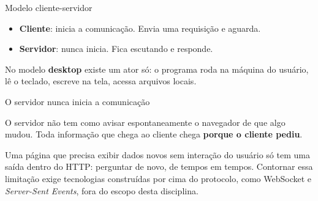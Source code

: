 \documentclass{beamer}
\begin{document}
\begin{frame}{Modelo cliente-servidor}
  \begin{center}
  \end{center}

  \begin{itemize}
    \item \textbf{Cliente}: inicia a comunicação. Envia uma requisição e aguarda.
    \item \textbf{Servidor}: nunca inicia. Fica escutando e responde.
  \end{itemize}

  \vspace{0.2cm}
  \footnotesize No modelo \textbf{desktop} existe um ator só: o programa roda na
  máquina do usuário, lê o teclado, escreve na tela, acessa arquivos locais.
\end{frame}

\begin{frame}{O servidor nunca inicia a comunicação}
  \begin{block}{}
    O servidor não tem como avisar espontaneamente o navegador de que algo
    mudou. Toda informação que chega ao cliente chega \textbf{porque o cliente
    pediu}.
  \end{block}

  \vspace{0.5cm}
  Uma página que precisa exibir dados novos sem interação do usuário só tem uma
  saída dentro do HTTP: perguntar de novo, de tempos em tempos. Contornar essa
  limitação exige tecnologias construídas por cima do protocolo, como WebSocket
  e \textit{Server-Sent Events}, fora do escopo desta disciplina.
\end{frame}
\end{document}

